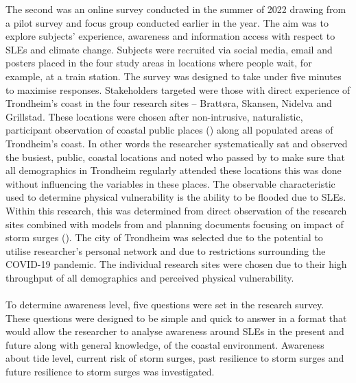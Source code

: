 The second was an online survey conducted in the summer of 2022 drawing from a pilot survey and focus group conducted earlier in the year. The aim was to explore subjects' experience, awareness and information access with respect to SLEs and climate change. Subjects were recruited via social media, email and posters placed in the four study areas in locations where people wait, for example, at a train station. The survey was designed to take under five minutes to maximise responses. Stakeholders targeted were those with direct experience of Trondheim’s coast in the four research sites – Brattøra, Skansen, Nidelva and Grillstad. These locations were chosen after non-intrusive, naturalistic, participant observation of coastal public places (\cite{del_casino_social_2009}) along all populated areas of Trondheim’s coast. In other words the researcher systematically sat and observed the busiest, public, coastal locations and noted who passed by to make sure that all demographics in Trondheim regularly attended these locations this was done without influencing the variables in these places.  The observable characteristic used to determine physical vulnerability is the ability to be flooded due to SLEs. Within this research, this was determined from direct observation of the research sites combined with models from \cite{kartverket_se_2021} and planning documents focusing on impact of storm surges (\cite{miljoenheten_og_byplankontoret_trondheim_kommune_9-notat-om-havnivastigning-og-stormflo---hensyn-i-arealplanlegging-nyhavnapdf_2020}). The city of Trondheim was selected due to the potential to utilise researcher's personal network and due to restrictions surrounding the COVID-19 pandemic. The individual research sites were chosen due to their high throughput of all demographics and perceived physical vulnerability.

\paragraph{}
To determine awareness level, five questions were set in the research survey. These questions were designed to be simple and quick to answer in a format that would allow the researcher to analyse awareness around SLEs in the present and future along with general knowledge, of the coastal environment. Awareness about tide level, current risk of storm surges, past resilience to storm surges and future resilience to storm surges was investigated. 





